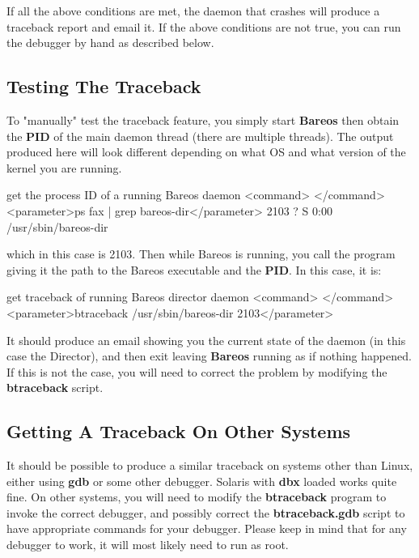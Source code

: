 If all the above conditions are met, the daemon that crashes will produce a
traceback report and email it. If the above conditions are not true,
you can run the debugger by hand as described below.

\subsection{Testing The Traceback}

To "manually" test the traceback feature, you simply start {\bf Bareos} then
obtain the {\bf PID} of the main daemon thread (there are multiple threads).
The output produced here will look different depending on what OS and what
version of the kernel you are running.

\begin{commands}{get the process ID of a running Bareos daemon}
<command> </command><parameter>ps fax | grep bareos-dir</parameter>
 2103 ?        S      0:00 /usr/sbin/bareos-dir
\end{commands}

which in this case is 2103. Then while Bareos is running, you call the program
giving it the path to the Bareos executable and the {\bf PID}. In this case,
it is:

\begin{commands}{get traceback of running Bareos director daemon}
<command> </command><parameter>btraceback /usr/sbin/bareos-dir 2103</parameter>
\end{commands}

It should produce an email showing you the current state of the daemon (in
this case the Director), and then exit leaving {\bf Bareos} running as if
nothing happened. If this is not the case, you will need to correct the
problem by modifying the {\bf btraceback} script.

\subsection{Getting A Traceback On Other Systems}

It should be possible to produce a similar traceback on systems other than
Linux, either using {\bf gdb} or some other debugger. Solaris with {\bf dbx}
loaded works quite fine. On other systems, you will need to modify the {\bf
btraceback} program to invoke the correct debugger, and possibly correct the
{\bf btraceback.gdb} script to have appropriate commands for your debugger.
Please keep in mind that for any debugger to
work, it will most likely need to run as root.


